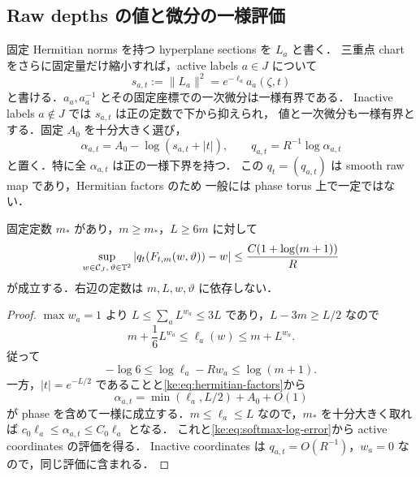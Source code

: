 \subsection{Raw depths の値と微分の一様評価}

固定 Hermitian norms を持つ hyperplane sections を $L_a$ と書く．
三重点 chart をさらに固定量だけ縮小すれば，active labels $a\in J$ について
\begin{equation}\label{ke:eq:hermitian-factors}
 s_{a,t}:=\|L_a\|^2=e^{-\ell_a}a_a(\zeta,t)
\end{equation}
と書ける．$a_a,a_a^{-1}$ とその固定座標での一次微分は一様有界である．
Inactive labels $a\notin J$ では $s_{a,t}$ は正の定数で下から抑えられ，
値と一次微分も一様有界とする．固定 $A_0$ を十分大きく選び，
\begin{equation}\label{ke:eq:raw-depths}
 \alpha_{a,t}=A_0-\log(s_{a,t}+|t|),
 \qquad q_{a,t}=R^{-1}\log\alpha_{a,t}
\end{equation}
と置く．特に全 $\alpha_{a,t}$ は正の一様下界を持つ．
この $q_t=(q_{a,t})$ は smooth raw map であり，Hermitian factors のため
一般には phase torus 上で一定ではない．

\begin{lemma}\label{ke:raw-values}
固定定数 $m_*$ があり，$m\ge m_*$，$L\ge6m$ に対して
\begin{equation}\label{ke:eq:raw-target-error}
 \sup_{w\in\mathcal C_J,\,\vartheta\in\mathbb T^2}
 |q_t(F_{t,m}(w,\vartheta))-w|
 \le\frac{C(1+\log(m+1))}{R}
\end{equation}
が成立する．右辺の定数は $m,L,w,\vartheta$ に依存しない．
\end{lemma}
\begin{proof}
$\max w_a=1$ より $L\le\sum_aL^{w_a}\le3L$ であり，$L-3m\ge L/2$ なので
\[
 m+\frac16L^{w_a}\le\ell_a(w)\le m+L^{w_a}.
\]
従って
\begin{equation}\label{ke:eq:softmax-log-error}
 -\log6\le\log\ell_a-Rw_a\le\log(m+1).
\end{equation}
一方，$|t|=e^{-L/2}$ であることと\eqref{ke:eq:hermitian-factors}から
\begin{equation}\label{ke:eq:capped-depth}
 \alpha_{a,t}=\min(\ell_a,L/2)+A_0+O(1)
\end{equation}
が phase を含めて一様に成立する．$m\le\ell_a\le L$ なので，$m_*$ を十分大きく取れば
$c_0\ell_a\le\alpha_{a,t}\le C_0\ell_a$ となる．
これと\eqref{ke:eq:softmax-log-error}から active coordinates の評価を得る．
Inactive coordinates は $q_{a,t}=O(R^{-1})$，$w_a=0$ なので，同じ評価に含まれる．
\end{proof}

